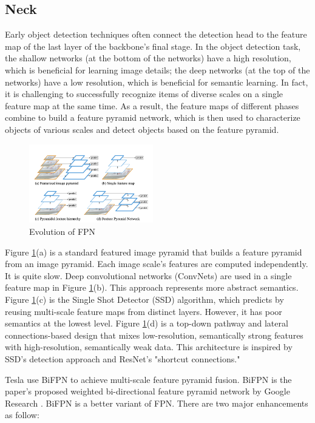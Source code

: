\documentclass[letterpaper, 10 pt, conference]{ieeeconf}  %
\begin{document}
\subsection{Neck}
Early object detection techniques often connect the detection head to the feature map of the last layer of the backbone's final stage. In the object detection task, the shallow networks (at the bottom of the networks) have a high resolution, which is beneficial for learning image details; the deep networks (at the top of the networks) have a low resolution, which is beneficial for semantic learning. In fact, it is challenging to successfully recognize items of diverse scales on a single feature map at the same time. As a result, the feature maps of different phases combine to build a feature pyramid network, which is then used to characterize objects of various scales and detect objects based on the feature pyramid\cite{zhang_2021}.

\begin{figure}[hbt!]
\centering
\includegraphics[width=0.48\textwidth]{gfx/pyramid_network.png}
\caption{Evolution of FPN}
\label{pyramid}
\end{figure}

Figure \ref{pyramid}(a) is a standard featured image pyramid that builds a feature pyramid from an image pyramid. Each image scale's features are computed independently. It is quite slow. Deep convolutional networks (ConvNets) are used in a single feature map in Figure \ref{pyramid}(b). This approach represents more abstract semantics. Figure \ref{pyramid}(c) is the Single Shot Detector (SSD) algorithm, which predicts by reusing multi-scale feature maps from distinct layers. However, it has poor semantics at the lowest level. Figure \ref{pyramid}(d) is a top-down pathway and lateral connections-based design that mixes low-resolution, semantically strong features with high-resolution, semantically weak data\cite{Lin_2017_CVPR}. This architecture is inspired by SSD's detection approach and ResNet's "shortcut connections."

Tesla use BiFPN to achieve multi-scale feature pyramid fusion. BiFPN is the paper's proposed weighted bi-directional feature pyramid network by Google Research \cite{Tan_2020_CVPR}. BiFPN is a better variant of FPN. There are two major enhancements as follow:
\end{document}
